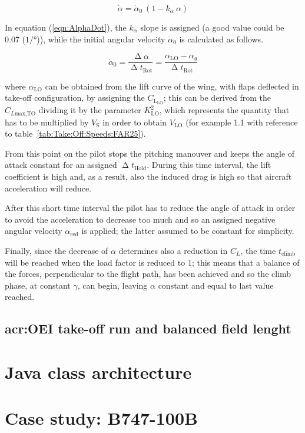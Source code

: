 \begin{equation}
\dot\alpha=\dot\alpha_0\ \left(1-k_\alpha\ \alpha\right)
\label{eqn:AlphaDot}
\end{equation}

In equation (\ref{eqn:AlphaDot}), the $k_\alpha$ slope is assigned (a good value could be 0.07 ($\si{1/\degree}$)), while the initial angular velocity $\dot\alpha_0$ is calculated as follows.

\begin{equation}
\dot\alpha_0=\dfrac{\upDelta\alpha}{\upDelta t_{\text{Rot}}}=\dfrac{\alpha_{\text{LO}}-\alpha_g}{\upDelta t_{\text{Rot}}}
\label{eqn:AlphaDotInitial}
\end{equation}

where $\alpha_{\text{LO}}$ can be obtained from the lift curve of the wing, with flaps deflected in take-off configuration, by assigning the $C_{\text{L}_{\text{LO}}}$; this can be derived from the $C_{L\text{max,TO}}$ dividing it by the parameter $K^2_{\text{LO}}$, which represents the quantity that has to be multiplied by $V_{\text{S}}$ in order to obtain $V_{\text{LO}}$ (for example 1.1 with reference to table~\ref{tab:Take:Off:Speeds:FAR25}).

\bigskip
\noindent
From this point on the pilot stops the pitching manouver and keeps the angle of attack constant for an assigned $\upDelta t_{\text{Hold}}$. During this time interval, the lift coefficient is high and, as a result, also the induced drag is high so that aircraft acceleration will reduce. 

After this short time interval the pilot has to reduce the angle of attack in order to avoid the acceleration to decrease too much and so an assigned negative angular velocity $\dot\alpha_{\text{red}}$ is applied; the latter assumed to be constant for simplicity. 

Finally, since the decrease of $\alpha$ determines also a reduction in $C_L$, the time $t_{\text{climb}}$ will be reached when the load factor is reduced to 1; this means that a balance of the forces, perpendicular to the flight path, has been achieved and so the climb phase, at constant $\gamma$, can begin, leaving $\alpha$ constant and equal to last value reached. 

\subsection{\gls{acr:OEI} take-off run and balanced field lenght}


\section{Java class architecture}
\section{Case study: B747-100B}
